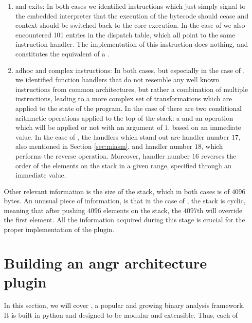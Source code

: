 \begin{enumerate}
    \item {} and exits: In both cases we identified  instructions which just simply signal to the embedded interpreter that the execution of the bytecode should cease and context should be switched back to the core execution. In the case of  we also encountered 101 entries in the dispatch table, which all point to the same instruction handler. The implementation of this instruction does nothing, and constitutes the equivalent of a .
    \item adhoc and complex instructions: In both cases, but especially in the case of , we identified function handlers that do not resemble any well known instructions from common architectures, but rather a combination of multiple instructions, leading to a more complex set of transformations which are applied to the state of the program. In the case of  there are two conditional arithmetic operations applied to the top of the stack: a  and an  operation which will be applied or not with an argument of $1$, based on an immediate value. In the case of , the handlers which stand out are handler number $17$, also mentioned in Section \ref{sec:miasm}, and handler number $18$, which performs the reverse operation. Moreover, handler number $16$ reverses the order of the elements on the stack in a given range, specified through an immediate value.
\end{enumerate} 

Other relevant information is the size of the stack, which in both cases is of $4096$ bytes. An unusual piece of information, is that in the case of , the stack is cyclic, meaning that after pushing $4096$ elements on the stack, the $4097$th will override the first element. All the information acquired during this stage is crucial for the proper implementation of the  plugin.

\section{Building an angr architecture plugin}

In this section, we will cover  \cite{angr}, a popular and growing binary analysis framework. It is built in python and designed to be modular and extensible. Thus, each of 


